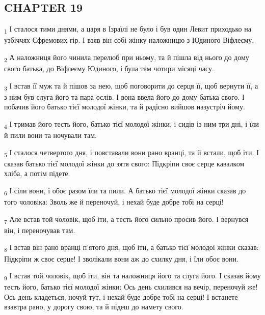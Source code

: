 \subsection{CHAPTER 19}
\begin{tcolorbox}
\textsubscript{1} І сталося тими днями, а царя в Ізраїлі не було і був один Левит приходько на узбіччях Єфремових гір. І взяв він собі жінку наложницю з Юдиного Віфлеєму.
\end{tcolorbox}
\begin{tcolorbox}
\textsubscript{2} А наложниця його чинила перелюб при ньому, та й пішла від нього до дому свого батька, до Віфлеєму Юдиного, і була там чотири місяці часу.
\end{tcolorbox}
\begin{tcolorbox}
\textsubscript{3} І встав її муж та й пішов за нею, щоб поговорити до серця її, щоб вернути її, а з ним був слуга його та пара ослів. І вона ввела його до дому батька свого. І побачив його батько тієї молодої жінки, та й радісно вийшов назустріч йому.
\end{tcolorbox}
\begin{tcolorbox}
\textsubscript{4} І тримав його тесть його, батько тієї молодої жінки, і сидів із ним три дні, і їли й пили вони та ночували там.
\end{tcolorbox}
\begin{tcolorbox}
\textsubscript{5} І сталося четвертого дня, і повставали вони рано вранці, та й встали, щоб іти. І сказав батько тієї молодої жінки до зятя свого: Підкріпи своє серце кавалком хліба, а потім підете.
\end{tcolorbox}
\begin{tcolorbox}
\textsubscript{6} І сіли вони, і обоє разом їли та пили. А батько тієї молодої жінки сказав до того чоловіка: Зволь же й переночуй, і нехай буде добре тобі на серці!
\end{tcolorbox}
\begin{tcolorbox}
\textsubscript{7} Але встав той чоловік, щоб іти, а тесть його сильно просив його. І вернувся він, і переночував там.
\end{tcolorbox}
\begin{tcolorbox}
\textsubscript{8} І встав він рано вранці п'ятого дня, щоб іти, а батько тієї молодої жінки сказав: Підкріпи ж своє серце! І зволікали вони аж до схилку дня, і їли обоє вони.
\end{tcolorbox}
\begin{tcolorbox}
\textsubscript{9} І встав той чоловік, щоб іти, він та наложниця його та слуга його. І сказав йому тесть його, батько тієї молодої жінки: Ось день схилився на вечір, переночуй же! Ось день кладеться, ночуй тут, і нехай буде добре тобі на серці! І встанете взавтра рано, у дорогу свою, та й підеш до намету свого.
\end{tcolorbox}
